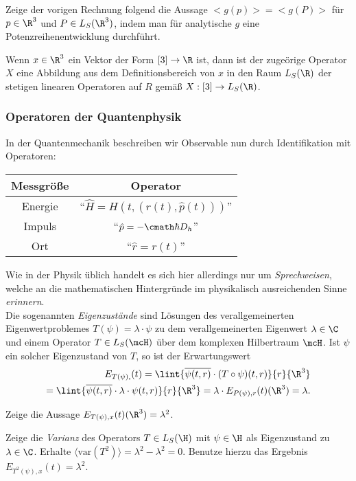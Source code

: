 \documentclass{subfiles}
\begin{document}
            \begin{Aufgabe}
                \nr{} Zeige der vorigen Rechnung folgend die Aussage $<g(p)> = <g(P)>$ für $p\in\R^3$ und $P\in L_S(\R^3)$, indem man für analytische $g$ eine Potenzreihenentwicklung durchführt. 
            \end{Aufgabe}

        Wenn $x\in\R^3$ ein Vektor der Form $[3]\to\R$ ist, dann ist der zugeörige Operator $X$ eine Abbildung aus dem Definitionsbereich von $x$ in den Raum $L_S(\R)$ der stetigen linearen Operatoren auf $R$ gemäß $X:[3]\to L_S(\R)$. 

        \subsubsection*{Operatoren der Quantenphysik}
            In der Quantenmechanik beschreiben wir Observable nun durch Identifikation mit Operatoren:
            \begin{table}
                \begin{tabular}{c|c}
                    Messgröße & Operator \\
                    \hline
                    Energie & \enquote{$\hat H = H(t,(r(t),\hat p(t)))$} \\
                    Impuls & \enquote{$\hat p = -\cmath\hbar D_h$} \\
                    Ort & \enquote{$\hat r = r(t)$}
                \end{tabular}
            \end{table}
            Wie in der Physik üblich handelt es sich hier allerdings nur um \emph{Sprechweisen}, welche an die mathematischen Hintergründe im physikalisch ausreichenden Sinne \emph{erinnern}. \\

            Die sogenannten \emph{Eigenzustände} sind Lösungen des verallgemeinerten Eigenwertproblemes $T(\psi) = \lambda\cdot\psi$ zu dem verallgemeinerten Eigenwert $\lambda\in\C$ und einem Operator $T\in L_S(\mcH)$ über dem komplexen Hilbertraum $\mcH$. Ist $\psi$ ein solcher Eigenzustand von $T$, so ist der Erwartungswert 
            \begin{align*}
                E_{T(\psi),}(t) = \lint{\overline{\psi(t,r)}\cdot (T\circ\psi)(t,r)}{r}{\R^3} \\
                = \lint{\overline{\psi(t,r)}\cdot \lambda\cdot\psi(t,r)}{r}{\R^3} = \lambda\cdot E_{P(\psi),r}(t)(\R^3) = \lambda.
            \end{align*}
            
            \begin{Aufgabe}
                \nr{} Zeige die Aussage $E_{T(\psi),x}(t)(\R^3) = \lambda^2$. 

                \nr{} Zeige die \emph{Varianz} des Operators $T\in L_S(\H)$ mit $\psi\in\H$ als Eigenzustand zu $\lambda\in\C$. Erhalte $\langle\text{var}(T^2)\rangle = \lambda^2-\lambda^2 = 0$. Benutze hierzu das Ergebnis $E_{T^2(\psi),x}(t) = \lambda^2$. 
            \end{Aufgabe}
\end{document}
